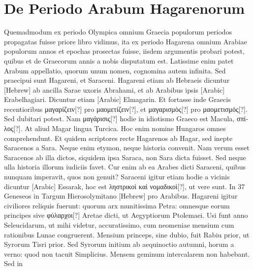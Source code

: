 \section{De Periodo Arabum Hagarenorum}
%
\begin{table}[htbp]
  
\end{table}
%
Quemadmodum
ex periodo Olympica
omnium Graecia
populorum periodos
propagatas fuisse priore libro
vidimus, ita ex periodo
Hagarena omnium
Arabiae populorum annos
et epochas prosectas
fuisse, iisdem argumentis
probari potest, quibus et
de Graecorum annis a nobis
disputatum est. Latissime
enim patet Arabum
appellatio, quorum unum
nomen, cognomina autem
infinita.
Sed praecipui
sunt Hagareni, et Saraceni.
Hagareni etiam ab
Hebraeis dicuntur \texthebrew{}[Hebrew] ab ancilla Sarae uxoris Abrahami,
 et ab Arabibus
ipsis \textarabic{}[Arabic] Erabelhagiari.
%
Dicuntur etiam \textarabic{}[Arabic]
Elmagarin.
Et fortasse inde Graecis recentioribus \textgreek{μαγαρίζειν[?]}
 pro \textgreek{μαομετίζειν[?]},
et \textgreek{μαγαρισμὸς[?]} pro \textgreek{μαομετισμός[?]}.
Sed dubitari potest.
Nam
\textgreek{μαγάρισις[?]} hodie in idiotismo Graeco est Macula,
 \textgreek{σπίλος[?]}.
At aliud
Magar lingua Turcica.
Hoc enim nomine Hungaros omnes comprehendunt.
Et quidem scriptores recte Hagarenos ab Hagar, sed inepte
Saracenos a Sara.
Neque enim etymon, neque historia convenit.
Nam verum esset Saracenos ab illa dictos, siquidem ipsa Saraca, non
Sara dicta fuisset.
Sed neque ulla historia illorum iudiciis favet.
Cur
enim ab ea Arabes dicti Saraceni, quibus nunquam imperavit, quos
non genuit?
Saraceni igitur etiam hodie a vicinis dicuntur \textarabic{}[Arabic]
Essarak, hoc est \textgreek{ληστρικοὶ καὶ νομαδικοὶ[?]}, ut vere sunt.
In 37 Geneseos in
Targum Hierosolymitano \texthebrew{}[Hebrew] pro Arabibus.
Hagareni igitur civiliores
reliquis fuerunt: quorum arx munitissima Petra: omnesque eorum
principes sive \textgreek{φύλαρχοι[?]} Aretae dicti, ut Aegyptiorum Ptolemaei.
Usi
funt anno Seleucidarum, ut mihi videtur, accuratissimo, cum neomeniae
mensium cum rationibus Lunae congruerent.
Mensium princeps,
sine dubio, fuit Rabiu prior, ut Syrorum Tisri prior.
Sed
Syrorum initium ab aequinoctio autumni, horum a verno: quod non tacuit
Simplicius.
Mensem geminum intercalarem non habebant.
Sed in

